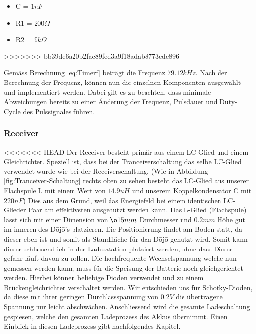 \begin{itemize}
\item C = $1nF$
\item R1 = $200\Omega$
\item R2 = $9k\Omega$
\end{itemize}
>>>>>>> bb39de6a20b2fac89fed3a9f18adab8773cde896
 
Gemäss Berechnung \ref{eq:Timerf} beträgt die Frequenz $79.12kHz$. Nach der Berechnung der Frequenz, können nun die einzelnen Komponenten ausgewählt und implementiert werden. Dabei gilt es zu beachten, dass minimale Abweichungen bereits zu einer Änderung der Frequenz, Pulsdauer und Duty-Cycle des Pulssignales führen.

\subsubsection*{Receiver}
<<<<<<< HEAD
Der Receiver besteht primär aus einem LC-Glied und einem Gleichrichter. Speziell ist, dass bei der Tranceiverschaltung das selbe LC-Glied verwendet wurde wie bei der Receiverschaltung. (Wie in Abbildung \ref{fig:Tranceiver-Schaltung} rechts oben zu sehen besteht das LC-Glied aus unserer Flachspule L mit einem Wert von $14.9uH$ und unserem Koppelkondensator C mit $220nF$)  Dies aus dem Grund, weil das Energiefeld bei einem identischen LC-Glieder Paar am effektivsten ausgenutzt werden kann. Das L-Glied (Flachspule) lässt sich mit einer Dimension von $\o 15mm$ Durchmesser und $0.2mm$ Höhe gut im inneren des Dōjō’s platzieren. Die Positionierung findet am Boden statt, da dieser eben ist und somit als Standfläche für den Dōjō genutzt wird. Somit kann dieser schlussendlich in der Ladesatation platziert werden, ohne dass Dieser gefahr läuft davon zu rollen. Die hochfrequente Wechselspannung welche nun gemessen werden kann, muss für die Speisung der Batterie noch gleichgerichtet werden. Hierbei können beliebige Dioden verwendet  und zu einem Brückengleichrichter verschaltet werden. Wir entschieden uns für Schotky-Dioden, da diese mit ihrer geringen Durchlassspannung von $0.2V$ die übertragene Spannung nur leicht abschwächen. Anschliessend wird die gesamte Ladeschaltung gespiesen, welche den gesamten Ladeprozess des Akkus übernimmt. Einen Einblick in diesen Ladeprozess gibt nachfolgendes Kapitel.

